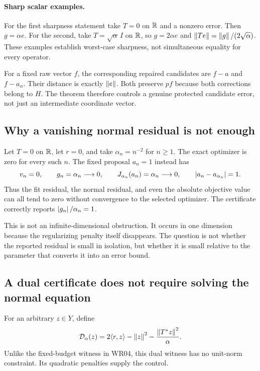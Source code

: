 \paragraph{Sharp scalar examples.} For the first sharpness statement take $T=0$ on $\mathbb R$ and a nonzero error. Then $g=\alpha e$. For the second, take $T=\sqrt\alpha\,I$ on $\mathbb R$, so $g=2\alpha e$ and $\left\lVert Te\right\rVert=\left\lVert g\right\rVert/(2\sqrt\alpha)$. These examples establish worst-case sharpness, not simultaneous equality for every operator.

For a fixed raw vector $f$, the corresponding repaired candidates are $f-a$ and $f-a_\alpha$. Their distance is exactly $\left\lVert e\right\rVert$. Both preserve $pf$ because both corrections belong to $H$. The theorem therefore controls a genuine protected candidate error, not just an intermediate coordinate vector.


\subsection{Why a vanishing normal residual is not enough}
Let $T=0$ on $\mathbb R$, let $r=0$, and take $\alpha_n=n^{-2}$ for $n\ge1$. The exact optimizer is zero for every such $n$. The fixed proposal $a_n=1$ instead has
\[
 v_n=0,\qquad g_n=\alpha_n\longrightarrow0,\qquad
 J_{\alpha_n}(a_n)=\alpha_n\longrightarrow0,
 \qquad\left\lvert a_n-a_{\alpha_n}\right\rvert=1.
\]
Thus the fit residual, the normal residual, and even the absolute objective value can all tend to zero without convergence to the selected optimizer. The certificate correctly reports $\left\lvert g_n\right\rvert/\alpha_n=1$.

This is not an infinite-dimensional obstruction. It occurs in one dimension because the regularizing penalty itself disappears. The question is not whether the reported residual is small in isolation, but whether it is small relative to the parameter that converts it into an error bound.

\subsection{A dual certificate does not require solving the normal equation}
For an arbitrary $z\in Y$, define
\[
 \mathcal D_\alpha(z)=2\langle r,z\rangle-\left\lVert z\right\rVert^2
                    -\frac{\left\lVert T^*z\right\rVert^2}{\alpha}.
\]
Unlike the fixed-budget witness in WR04, this dual witness has no unit-norm constraint. Its quadratic penalties supply the control.

